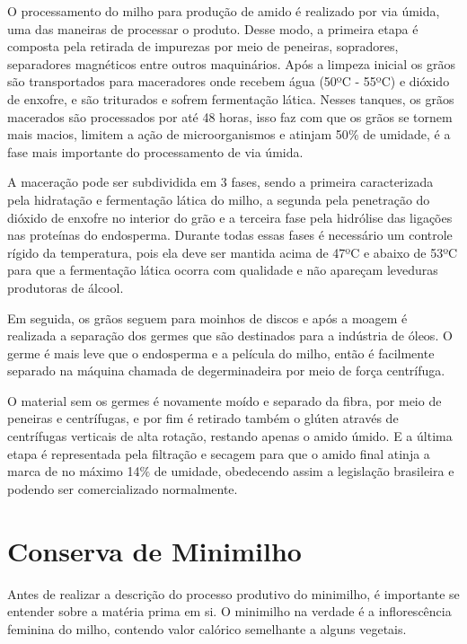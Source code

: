 \documentclass[
	12pt,				%
	openright,			%
	oneside,			%
	a4paper,			%
	english,			%
	french,				%
	spanish,			%
	brazil				%
	]{abntex2}
\begin{document}
O processamento do milho para produção de amido é realizado por via úmida, uma das maneiras de processar o produto. Desse modo, a primeira etapa é composta pela retirada de impurezas por meio de peneiras, sopradores, separadores magnéticos entre outros maquinários. Após a limpeza inicial os grãos são transportados para maceradores onde recebem água (50ºC - 55ºC) e dióxido de enxofre, e são triturados e sofrem fermentação lática. Nesses tanques, os grãos macerados são processados por até 48 horas, isso faz com que os grãos se tornem mais macios, limitem a ação de microorganismos e atinjam 50$\%$ de umidade, é a fase mais importante do processamento de via úmida. \cite{da2019analise}

A maceração pode ser subdividida em 3 fases, sendo a primeira caracterizada pela hidratação e fermentação lática do milho, a segunda pela penetração do dióxido de enxofre no interior do grão e a terceira fase pela hidrólise das ligações nas proteínas do endosperma. Durante todas essas fases é necessário um controle rígido da temperatura, pois ela deve ser mantida acima de 47ºC e abaixo de 53ºC para que a fermentação lática ocorra com qualidade e não apareçam leveduras produtoras de álcool. \cite{peixoto2017avaliaccao}

Em seguida, os grãos seguem para moinhos de discos e após a moagem é realizada a separação dos germes que são destinados para a indústria de óleos. O germe é mais leve que o endosperma e a película do milho, então é facilmente separado na máquina chamada de degerminadeira por meio de força centrífuga. \cite{geraldi2010estudo}

O material sem os germes é novamente moído e separado da fibra, por meio de peneiras e centrífugas, e por fim é retirado também o glúten através de centrífugas verticais de alta rotação, restando apenas o amido úmido. E a última etapa é representada pela filtração e secagem para que o amido final atinja a marca de no máximo 14$\%$ de umidade, obedecendo assim a legislação brasileira e podendo ser comercializado normalmente. \cite{da2019analise}


\section{Conserva de Minimilho}

Antes de realizar a descrição do processo produtivo do minimilho, é importante se entender sobre a matéria prima em si. O minimilho na verdade é a inflorescência feminina do milho, contendo valor calórico semelhante a alguns vegetais. 
\end{document}
